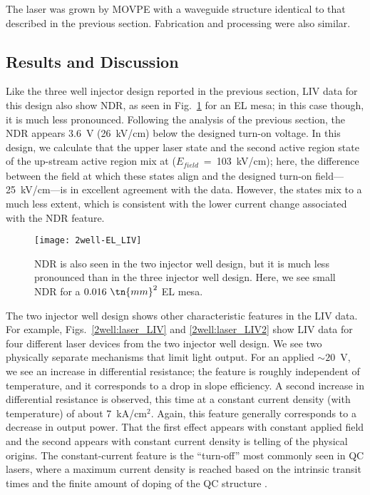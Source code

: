 The laser was grown by MOVPE with a waveguide structure identical to that described in the previous section.  Fabrication and processing were also similar.


\subsection{Results and Discussion}

Like the three well injector design reported in the previous section, LIV data for this design also show NDR, as seen in Fig.~\ref{2well:EL_LIV} for an EL mesa; in this case though, it is much less pronounced.  Following the analysis of the previous section, the NDR appears 3.6~V (26~kV/cm) below the designed turn-on voltage.  In this design, we calculate that the upper laser state and the second active region state of the up-stream active region mix at ($E_\textit{field}$~=~103~kV/cm); here, the difference between the field at which these states align and the designed turn-on field---25~kV/cm---is in excellent agreement with the data.  However, the states mix to a much less extent, which is consistent with the lower current change associated with the NDR feature.

\begin{figure}[tp]
\centering
\texttt{[image: 2well-EL\_LIV]}
\caption[LIV for a two injector well EL sample]{ NDR is also seen in the two injector well design, but it is much less pronounced than in the three injector well design.  Here, we see small NDR for a $0.016~\tn{mm}^2$ EL mesa.}
\label{2well:EL_LIV}
\end{figure}

The two injector well design shows other characteristic features in the LIV data.  For example, Figs.~\ref{2well:laser_LIV} and \ref{2well:laser_LIV2} show LIV data for four different laser devices from the two injector well design.  We see two physically separate mechanisms that limit light output.  For an applied $\sim\!20$~V, we see an increase in differential resistance; the feature is roughly independent of temperature, and it corresponds to a drop in slope efficiency.  A second increase in differential resistance is observed, this time at a constant current density (with temperature) of about 7~kA/cm$^2$.  Again, this feature generally corresponds to a decrease in output power.  That the first effect appears with constant applied field and the second appears with constant current density is telling of the physical origins.  The constant-current feature is the ``turn-off'' most commonly seen in QC lasers, where a maximum current density is reached based on the intrinsic transit times and the finite amount of doping of the QC structure \cite{Aellen:JAP:2006}.

